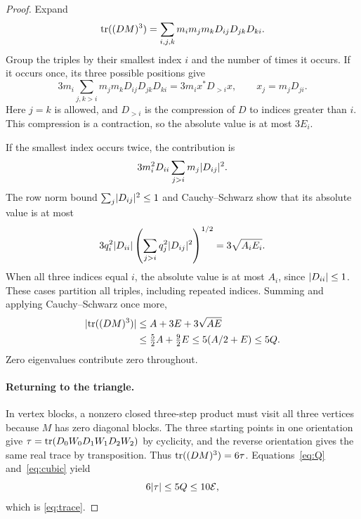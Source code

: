 \begin{proof}
Expand
\[
 \operatorname{tr}((DM)^3)=\sum_{i,j,k}m_im_jm_kD_{ij}D_{jk}D_{ki}.
\]
Group the triples by their smallest index \(i\) and the number of
times it occurs. If it occurs once, its three possible positions give
\[
 3m_i\sum_{j,k>i}m_jm_kD_{ij}D_{jk}D_{ki}
       =3m_i x^*D_{>i}x,\qquad x_j=m_jD_{ji}.
\]
Here \(j=k\) is allowed, and \(D_{>i}\) is the compression of \(D\)
to indices greater than \(i\). This compression is a contraction,
so the absolute value is at most \(3E_i\).

If the smallest index occurs twice, the contribution is
\[
 3m_i^2D_{ii}\sum_{j>i}m_j\lvert D_{ij}\rvert^2.
\]
The row norm bound \(\sum_j\lvert D_{ij}\rvert^2\le1\) and
Cauchy--Schwarz show that its absolute value is at most
\[
 3q_i^2\lvert D_{ii}\rvert
       \left(\sum_{j>i}q_j^2\lvert D_{ij}\rvert^2\right)^{1/2}
       =3\sqrt{A_iE_i}.
\]
When all three indices equal \(i\), the absolute value is at most
\(A_i\), since \(\lvert D_{ii}\rvert\le1\).
These cases partition all triples, including repeated indices.
Summing and applying Cauchy--Schwarz once more,
\begin{equation}\label{eq:cubic}
 \begin{split}
 \lvert \operatorname{tr}((DM)^3)\rvert
 &\le A+3E+3\sqrt{AE}\\
 &\le \tfrac52A+\tfrac92E
 \le 5(A/2+E)\le5Q.
 \end{split}
\end{equation}
Zero eigenvalues contribute zero throughout.

\paragraph{Returning to the triangle.}
In vertex blocks, a nonzero closed three-step product must visit all
three vertices because \(M\) has zero diagonal blocks. The three
starting points in one orientation give
\(\tau=\operatorname{tr}(D_0W_0D_1W_1D_2W_2)\) by cyclicity, and the reverse
orientation gives the same real trace by transposition.
Thus \(\operatorname{tr}((DM)^3)=6\tau\). Equations~\eqref{eq:Q}
and~\eqref{eq:cubic} yield
\[
 6\lvert \tau\rvert\le5Q\le10\mathcal E,
\]
which is \eqref{eq:trace}.
\end{proof}
